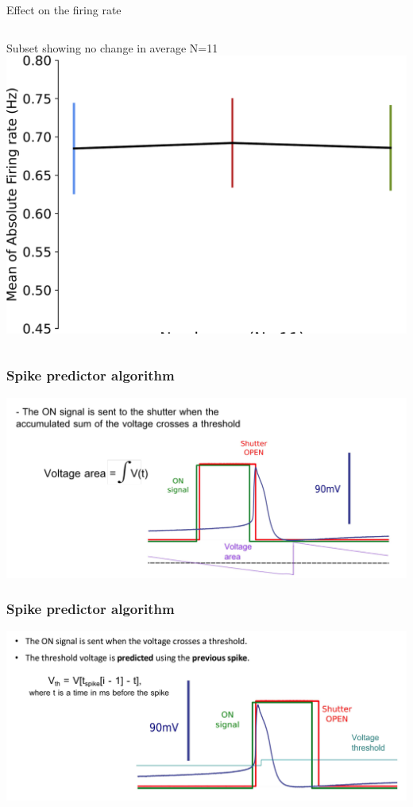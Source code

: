 \documentclass[aspectratio=43]{beamer}
\newcounter{mainframecount}
\begin{document}
\begin{frame}{Effect on the firing rate}
\begin{columns}
\begin{column}{0.5\textwidth}
		\small{Subset showing no change in average N=11}\\
			\includegraphics[width=\textwidth]{Images/FR_nochange.pdf}
		\end{column}
	\end{columns}
\end{frame}


\begin{frame}
	\frametitle{Spike predictor algorithm}
	\includegraphics[width=\textwidth]{Images/alg1.pdf}
\end{frame}

\begin{frame}
	\frametitle{Spike predictor algorithm}
	\includegraphics[width=\textwidth]{Images/alg2.pdf}
\end{frame}
\end{document}
